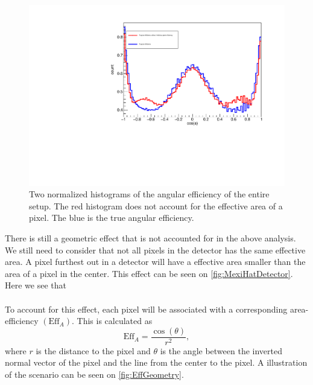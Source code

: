 \begin{figure}[h]
	\includegraphics[width=\linewidth]{../figures/allDetEff.pdf}
	\caption{Two normalized histograms of the angular efficiency of the entire setup. The red histogram does not account for the effective area of a pixel. The blue is the true angular efficiency.}
	\label{fig:effAllDet}
\end{figure}
There is still a geometric effect that is not accounted for in the above analysis. We still need to consider that not all pixels in the detector has the same effective area. 
A pixel furthest out in a detector will have a effective area smaller than the area of a pixel in the center. This effect can be seen on \cref{fig:MexiHatDetector}. Here we see that \\
\\
To account for this effect, each pixel will be associated with a corresponding area-efficiency $(\text{Eff}_A)$.
This is calculated as 
\begin{equation}
\text{Eff}_A = \dfrac{\cos(\theta)}{r^2 },
\end{equation}
where $r$ is the distance to the pixel and $\theta$ is the angle between the inverted normal vector of the pixel and the line from the center to the pixel. A illustration of the scenario can be seen on \cref{fig:EffGeometry}.


